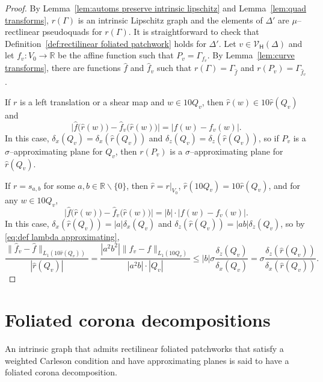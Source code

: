 \documentclass[11pt,reqno]{amsart}
\newcommand{\R}{\mathbb{R}}
\newcommand{\0}{\mathbf{0}}
\renewcommand{\1}{\mathbf 1}
\newcommand{\from}{\colon}
\renewcommand{\le}{\leqslant}
\renewcommand{\setminus}{\smallsetminus}
\theoremstyle{remark}
\newcommand{\cVh}{{\mathcal{V}_{\mathsf{H}}}}
\begin{document}
\begin{proof}
  By Lemma~\ref{lem:automs preserve intrinsic lipschitz} and Lemma~\ref{lem:quad transforms}, $r(\Gamma)$ is an intrinsic Lipschitz graph and the elements of $\Delta'$ are $\mu$--rectlinear pseudoquads for $r(\Gamma)$.  It is straightforward to check that Definition~\ref{def:rectilinear foliated patchwork} holds for $\Delta'$. Let $v\in \cVh(\Delta)$ and let $f_v\from V_0\to \R$ be the affine function such that $P_v=\Gamma_{f_v}$.  By Lemma~\ref{lem:curve transforms}, there are functions $\hat{f}$ and $\hat{f}_v$ such that $r(\Gamma)=\Gamma_{\hat{f}}$ and $r(P_v)=\Gamma_{\hat{f}_v}$.

  If $r$ is a left translation or a shear map and $w\in 10Q_v$, then $\hat{r}(w)\in 10\hat{r}(Q_v)$ and   $$\big|\hat{f}\big(\hat{r}(w)\big)-\hat{f}_v\big(\hat{r}(w)\big)\big|=|f(w)-f_v(w)|.$$
  In this case, $\delta_x(Q_v)=\delta_x(\hat{r}(Q_v))$ and $\delta_z(Q_v)=\delta_z(\hat{r}(Q_v))$, so if $P_v$ is a $\sigma$--approximating plane for $Q_v$, then $r(P_v)$ is a $\sigma$--approximating plane for $\hat{r}(Q_v)$.

  If $r=s_{a,b}$ for some $a,b\in \R\setminus \{0\}$, then $\hat{r}=r|_{V_0}$,  $\hat{r}(10Q_v)=10\hat{r}(Q_v)$, and for any $w\in 10Q_v$,
  $$\big|\hat{f}\big(\hat{r}(w)\big)-\hat{f}_v\big(\hat{r}(w)\big)\big|=|b|\cdot |f(w)-f_v(w)|.$$
  In this case, $\delta_x(\hat{r}(Q_v))=|a|\delta_x(Q_v)$ and $\delta_z(\hat{r}(Q_v))=|ab|\delta_z(Q_v)$, so by \eqref{eq:def lambda approximating},
 \begin{equation*}
 \frac{\|\hat{f}_v-\hat{f}\|_{L_1(10 \hat{r}(Q_v))}}{|\hat{r}(Q_v)|}=\frac{|a^2 b^2|\|f_v-f\|_{L_1(10 Q_v)}}{|a^2b|\cdot |Q_v|} \le |b| \sigma \frac{\delta_z(Q_v)}{\delta_x(Q_v)} =\sigma \frac{\delta_z(\hat{r}(Q_v))}{\delta_x(\hat{r}(Q_v))}.\tag*{\qedhere}
 \end{equation*}
\end{proof}

\section{Foliated corona decompositions}\label{sec:decompose here}

An intrinsic graph that admits rectilinear foliated patchworks that satisfy a weighted Carleson condition and have approximating planes is said to have a foliated corona decomposition.
\end{document}
